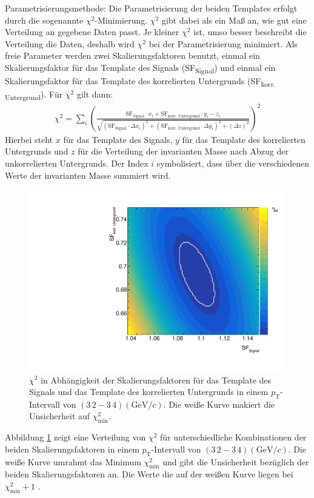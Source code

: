 Parametrisierungsmethode:
Die Parametrisierung der beiden Templates erfolgt durch die sogenannte $\chi^{2}$-Minimierung.
$\chi^{2}$ gibt dabei als ein Ma{\ss} an, wie gut eine Verteilung an gegebene Daten passt.
Je kleiner $\chi^{2}$ ist, umso besser beschreibt die Verteilung die Daten, deshalb wird $\chi^{2}$ bei der Parametrisierung minimiert.
Als freie Parameter werden zwei Skalierungsfaktoren benutzt, einmal ein Skalierungsfaktor f\"ur das Template des Signals (SF\textsubscript{Signal}) und einmal ein Skalierungsfaktor f\"ur das Template des korrelierten Untergrunds (SF\textsubscript{korr. Untergrund}).
F\"ur $\chi^{2}$ gilt dann:
\begin{align}
\chi^{2} = \sum_{i}\left(\frac{\text{SF}_\text{Signal}\cdot x_{i}+\text{SF}_\text{korr. Untergrund}\cdot y_{i}-z_{i}}{\sqrt{\left(\text{SF}_\text{Signal}\cdot\Delta x_{i}\right)^{2}+\left(\text{SF}_\text{korr. Untergrund}\cdot\Delta y_{i}\right)^{2}+\left(\Delta z\right)^{2}}}\right)^{2}
\label{eq:Chi2}
\end{align}
Hierbei steht $x$ f\"ur das Template des Signals, $y$ f\"ur das Template des korrelierten Untergrunds und $z$ f\"ur die Verteilung der invarianten Masse nach Abzug der unkorrelierten Untergrunds.
Der Index $i$  symbolisiert, dass \"uber die verschiedenen Werte der invarianten Masse summiert wird.
\begin{figure}[tp]
\centering
\includegraphics[width=.65\linewidth]{Chi2Map10_Data_2016.pdf}
\caption{$\chi^{2}$ in Abh\"angigkeit der Skalierungsfaktoren f\"ur das Template des Signals und das Template des korrelierten Untergrunds in einem $p_{\text{T}}$-Intervall von $(3\,2 - 3\,4)(\text{GeV}/c)$.
Die wei{\ss}e Kurve makiert die Unsicherheit auf $\chi^{2}_\text{min}$.}
\label{fig:Chi2Map}
\end{figure}
\newline
Abbildung \ref{fig:Chi2Map} zeigt eine Verteilung von $\chi^{2}$ f\"ur unterschiedliche Kombinationen der beiden Skalierungsfaktoren in einem $p_{\text{T}}$-Intervall von $(3\,2 - 3\,4)(\text{GeV}/c)$.
Die wei{\ss}e Kurve umrahmt das Minimum $\chi^{2}_\text{min}$ und gibt die Unsicherheit bez\"uglich der beiden Skalierungsfaktoren an.
Die Werte die auf der wei{\ss}en Kurve liegen bei $\chi^{2}_\text{min}+1$ \cite{book:chi2}.
\newline

